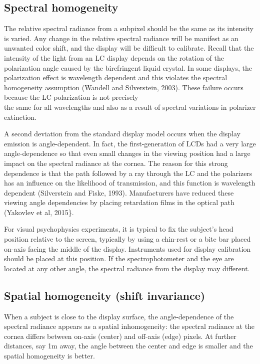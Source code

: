 \documentclass[
  letterpaper,
]{book}
\begin{document}
\subsection{Spectral homogeneity}\label{spectral-homogeneity}

The relative spectral radiance from a subpixel should be the same as its
intensity is varied. Any change in the relative spectral radiance will
be manifest as an unwanted color shift, and the display will be
difficult to calibrate. Recall that the intensity of the light from an
LC display depends on the rotation of the polarization angle caused by
the birefringent liquid crystal. In some displays, the polarization
effect is wavelength dependent and this violates the spectral
homogeneity assumption (Wandell and Silverstein, 2003). These failure
occurs because the LC polarization is not precisely\\
the same for all wavelengths and also as a result of spectral variations
in polarizer extinction.

A second deviation from the standard display model occurs when the
display emission is angle-dependent. In fact, the first-generation of
LCDs had a very large angle-dependence so that even small changes in the
viewing position had a large impact on the spectral radiance at the
cornea. The reason for this strong dependence is that the path followed
by a ray through the LC and the polarizers has an influence on the
likelihood of transmission, and this function is wavelength dependent
(Silverstein and Fiske, 1993). Manufacturers have reduced these viewing
angle dependencies by placing retardation films in the optical path
(Yakovlev et al, 2015\}.

For visual psychophysics experiments, it is typical to fix the subject's
head position relative to the screen, typically by using a chin-rest or
a bite bar placed on-axis facing the middle of the display. Instruments
used for display calibration should be placed at this position. If the
spectrophotometer and the eye are located at any other angle, the
spectral radiance from the display may different.

\subsection{Spatial homogeneity (shift
invariance)}\label{spatial-homogeneity-shift-invariance}

When a subject is close to the display surface, the angle-dependence of
the spectral radiance appears as a spatial inhomogeneity: the spectral
radiance at the cornea differs between on-axis (center) and off-axis
(edge) pixels. At further distances, say 1m away, the angle between the
center and edge is smaller and the spatial homogeneity is better.
\end{document}
